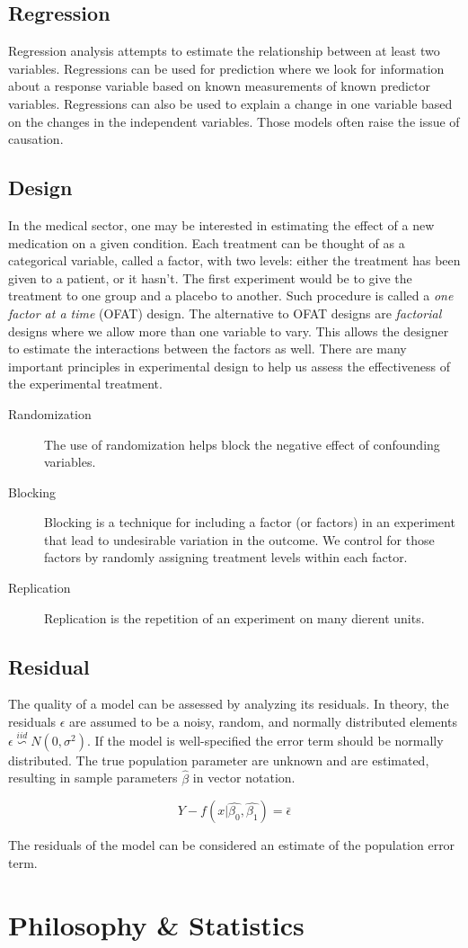 \documentclass{article}
\begin{document}
\subsection{Regression}
Regression analysis attempts to estimate the relationship between at least two
variables. Regressions can be used for prediction where we look for information
about a response variable based on known measurements of known predictor variables.
Regressions can also be used to explain a change in one variable based on the changes
in the independent variables. Those models often raise the issue of causation.

\subsection{Design}
In the medical sector, one may be interested in estimating the effect of a new
medication on a given condition. Each treatment can be thought of as a categorical
variable, called a factor, with two levels: either the treatment has been given
to a patient, or it hasn't. The first experiment would be to give the treatment
to one group and a placebo to another. Such procedure is called a
\textit{one factor at a time} (OFAT) design. The alternative to OFAT designs are
\textit{factorial} designs where we allow more than one variable to vary.
This allows the designer to estimate the interactions between the factors as well.
There are many important principles in experimental design to help us assess
the effectiveness of the experimental treatment.

\begin{description}
    \item[Randomization] The use of randomization helps block the negative effect of
          confounding variables.
    \item[Blocking] Blocking is a technique for including a factor (or factors) in
          an experiment that lead to undesirable variation in the outcome. We control for
          those factors by randomly assigning treatment levels within each factor.
    \item[Replication] Replication is the repetition of an experiment on many
          dierent units.
\end{description}

\subsection{Residual}
The quality of a model can be assessed by analyzing its residuals. In theory, the
residuals $\epsilon$ are assumed to be a noisy, random, and normally distributed
elements $\epsilon \overset{iid}{\backsim }N(0, \sigma^{2})$. If the model is
well-specified the error term should be normally distributed. The true population
parameter are unknown and are estimated, resulting in sample parameters $\hat{\beta}$
in vector notation.

$$
    Y - f(x | \hat{\beta_{0}}, \hat{\beta_{1}}) = \bar{\epsilon}
$$

The residuals of the model can be considered an estimate of the population error term.

\section{Philosophy \& Statistics}
\end{document}
